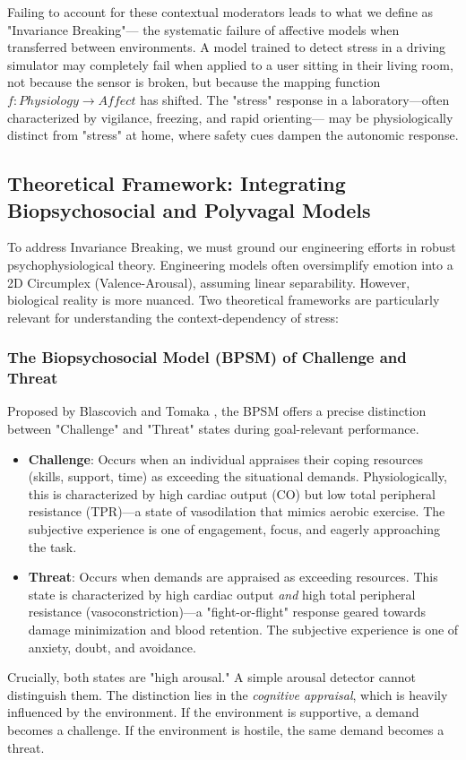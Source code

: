 \documentclass[journal]{IEEEtran}
\begin{document}
Failing to account for these contextual moderators leads to what we define as "Invariance Breaking"—
the systematic failure of affective models when transferred between environments. 
A model trained to detect stress in a driving simulator may completely fail when applied to a user sitting in their living room, 
not because the sensor is broken, but because the mapping function $f: Physiology \rightarrow Affect$ has shifted. 
The "stress" response in a laboratory—often characterized by vigilance, freezing, and rapid orienting—
may be physiologically distinct from "stress" at home, where safety cues dampen the autonomic response.

\subsection{Theoretical Framework: Integrating Biopsychosocial and Polyvagal Models}
To address Invariance Breaking, we must ground our engineering efforts in robust psychophysiological theory. 
Engineering models often oversimplify emotion into a 2D Circumplex (Valence-Arousal), assuming linear separability. 
However, biological reality is more nuanced. Two theoretical frameworks are particularly relevant for understanding the context-dependency of stress:

\subsubsection{The Biopsychosocial Model (BPSM) of Challenge and Threat}
Proposed by Blascovich and Tomaka \cite{biopsychosocial_model}, the BPSM offers a precise distinction between "Challenge" and "Threat" states 
during goal-relevant performance.
\begin{itemize}
    \item \textbf{Challenge}: Occurs when an individual appraises their coping resources (skills, support, time) as exceeding the situational demands. 
    Physiologically, this is characterized by high cardiac output (CO) but low total peripheral resistance (TPR)—a state of vasodilation 
    that mimics aerobic exercise. The subjective experience is one of engagement, focus, and eagerly approaching the task.
    \item \textbf{Threat}: Occurs when demands are appraised as exceeding resources. This state is characterized by high cardiac output 
    \textit{and} high total peripheral resistance (vasoconstriction)—a "fight-or-flight" response geared towards damage minimization and blood retention. 
    The subjective experience is one of anxiety, doubt, and avoidance.
\end{itemize}
Crucially, both states are "high arousal." A simple arousal detector cannot distinguish them. 
The distinction lies in the \textit{cognitive appraisal}, which is heavily influenced by the environment. 
If the environment is supportive, a demand becomes a challenge. If the environment is hostile, the same demand becomes a threat.
\end{document}

